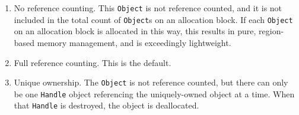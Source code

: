 \begin{enumerate}

\item No reference counting.  This \texttt{Object} is not reference counted, and it is not included in the total count of \texttt{Object}s on an allocation
block.  If each \texttt{Object} on an allocation block
is allocated in this way, this results in pure, region-based memory management, and is exceedingly lightweight.
\item Full reference counting.  This is the default.
\item Unique ownership.  The \texttt{Object} is not reference counted, but there can only be one \texttt{Handle} object referencing the uniquely-owned
object at a time.  When that \texttt{Handle} is destroyed, the object is deallocated.

\end{enumerate}


